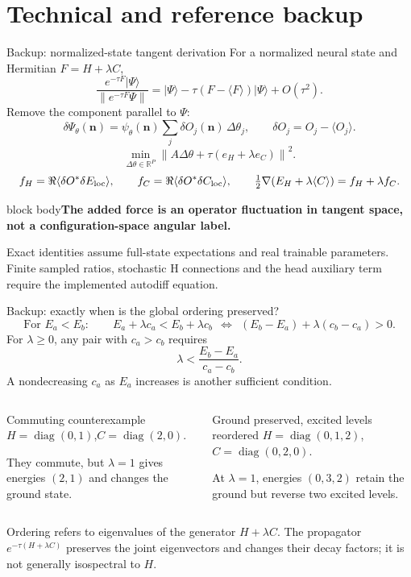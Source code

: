 \documentclass[aspectratio=169,10pt]{beamer}
\newcommand{\src}[1]{\vfill{\fontsize{6.3}{7.5}\selectfont\color{muted}#1\par}}
\newcommand{\take}[1]{\vspace{1mm}\begin{beamercolorbox}[sep=1.6mm,wd=\textwidth]{block body}\small\color{teal}\textbf{#1}\end{beamercolorbox}}
\newcommand{\R}{\mathbb R}
\newcommand{\ket}[1]{\lvert #1\rangle}
\newcommand{\nn}{\mathbf n}
\begin{document}
\section{Technical and reference backup}
\begin{frame}{Backup: normalized-state tangent derivation}
\small For a normalized neural state and Hermitian $F=H+\lambda C$,
\[
\frac{e^{-\tau F}\ket\Psi}{\|e^{-\tau F}\Psi\|}
=\ket\Psi-\tau(F-\langle F\rangle)\ket\Psi+O(\tau^2).
\]
Remove the component parallel to $\Psi$:
\[
\delta\Psi_\theta(\nn)=\psi_\theta(\nn)
\sum_j\delta O_j(\nn)\,\Delta\theta_j,\qquad
\delta O_j=O_j-\langle O_j\rangle.
\]
\[
\min_{\Delta\theta\in\R^P}
\left\|A\Delta\theta+\tau(e_H+\lambda e_C)\right\|^2.
\]
\[
f_H=\Re\langle\delta O^*\delta E_{\rm loc}\rangle,\qquad
f_C=\Re\langle\delta O^*\delta C_{\rm loc}\rangle,\qquad
\tfrac12\nabla(E_H+\lambda\langle C\rangle)=f_H+\lambda f_C.
\]
\take{The added force is an operator fluctuation in tangent space, not a configuration-space angular label.}
\src{Exact identities assume full-state expectations and real trainable parameters. Finite sampled ratios, stochastic H connections and the head auxiliary term require the implemented autodiff equation.}
\end{frame}

\begin{frame}{Backup: exactly when is the global ordering preserved?}
\[
\text{For }E_a<E_b:\qquad
E_a+\lambda c_a<E_b+\lambda c_b
\ \ \Longleftrightarrow\ \
(E_b-E_a)+\lambda(c_b-c_a)>0.
\]
\small For $\lambda\geq0$, any pair with $c_a>c_b$ requires
\[
\lambda<\frac{E_b-E_a}{c_a-c_b}.
\]
A nondecreasing $c_a$ as $E_a$ increases is another sufficient condition.
\begin{columns}[T,onlytextwidth]
\begin{block}{Commuting counterexample}
\small $H=\operatorname{diag}(0,1)$,\quad $C=\operatorname{diag}(2,0)$.\par\medskip
They commute, but $\lambda=1$ gives energies $(2,1)$ and changes the ground state.
\end{block}
\begin{block}{Ground preserved, excited levels reordered}
\small $H=\operatorname{diag}(0,1,2)$,\quad $C=\operatorname{diag}(0,2,0)$.\par\medskip
At $\lambda=1$, energies $(0,3,2)$ retain the ground but reverse two excited levels.
\end{block}
\end{columns}
\src{Ordering refers to eigenvalues of the generator $H+\lambda C$. The propagator $e^{-\tau(H+\lambda C)}$ preserves the joint eigenvectors and changes their decay factors; it is not generally isospectral to $H$.}
\end{frame}
\end{document}
